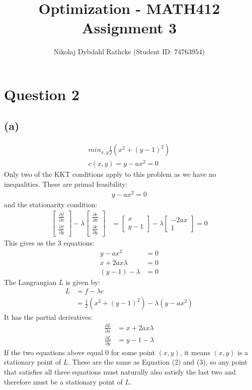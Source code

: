 \documentclass[a4paper, fleqn]{article}
\author{Nikolaj Dybdahl Rathcke (Student ID: 74763954)}
\title{Optimization - MATH412 \\ Assignment 3}
\begin{document}
\maketitle
\newpage

\section*{Question 2}
\subsection*{(a)}
\begin{align*}
  min_{x,y}\frac{1}{2}(x^2+(y-1)^2) \\
  c(x,y)=y-ax^2=0
\end{align*}
Only two of the KKT conditions apply to this problem as we have no inequalities. These are primal feasibility:
\begin{align*}
  y-ax^2=0
\end{align*}
and the stationarity condition:
\begin{align*}
  \begin{bmatrix}
    \frac{\partial f}{\partial x} \\
    \frac{\partial f}{\partial y}
  \end{bmatrix}
  -\lambda
  \begin{bmatrix}
    \frac{\partial c}{\partial x} \\
    \frac{\partial c}{\partial y}
  \end{bmatrix}
  &=
  \begin{bmatrix}
    x \\
    y-1
  \end{bmatrix}
  -\lambda
  \begin{bmatrix}
    -2ax \\
    1
  \end{bmatrix}
  =
  0
\end{align*}
This gives us the $3$ equations:
\begin{align}\label{eq1}
  y-ax^2        &= 0 \\
  x+2ax\lambda  &= 0 \\
  (y-1)-\lambda &= 0
\end{align}
The Langrangian $L$ is given by:
\begin{align*}
  L&=f-\lambda c \\
   &=\frac{1}{2}\left(x^2+(y-1)^2\right)-\lambda \left(y-ax^2\right)
\end{align*}
It has the partial derivatives:
\begin{align*}
  \frac{\partial L}{\partial x} &= x+2ax\lambda \\
  \frac{\partial L}{\partial y} &= y-1-\lambda
\end{align*}
If the two equations above equal $0$ for some point $(x,y)$, it means $(x,y)$ is a
stationary point of $L$. These are the same as Equation (2) and (3), so any point that
satisfies all three equations must naturally also satisfy the last two and therefore must
be a stationary point of $L$.
\end{document}
